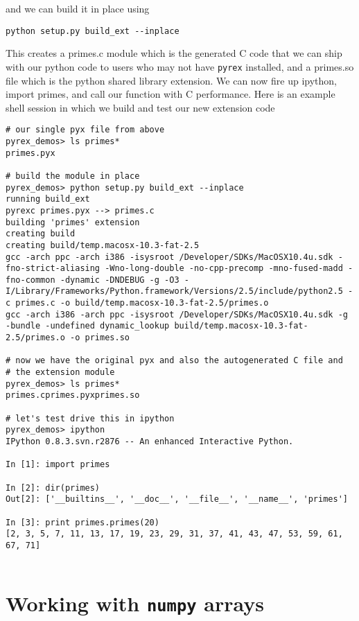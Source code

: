 and we can build it in place using

\begin{lstlisting}
python setup.py build_ext --inplace
\end{lstlisting}

This creates a primes.c module which is the generated C code that we
can ship with our python code to users who may not have \texttt{pyrex}
installed, and a primes.so file which is the python shared library
extension.  We can now fire up ipython, import primes, and call our
function with C performance.  Here is an example shell session in
which we build and test our new extension code

\begin{lstlisting}
# our single pyx file from above
pyrex_demos> ls primes*
primes.pyx

# build the module in place
pyrex_demos> python setup.py build_ext --inplace
running build_ext
pyrexc primes.pyx --> primes.c
building 'primes' extension
creating build
creating build/temp.macosx-10.3-fat-2.5
gcc -arch ppc -arch i386 -isysroot /Developer/SDKs/MacOSX10.4u.sdk -fno-strict-aliasing -Wno-long-double -no-cpp-precomp -mno-fused-madd -fno-common -dynamic -DNDEBUG -g -O3 -I/Library/Frameworks/Python.framework/Versions/2.5/include/python2.5 -c primes.c -o build/temp.macosx-10.3-fat-2.5/primes.o
gcc -arch i386 -arch ppc -isysroot /Developer/SDKs/MacOSX10.4u.sdk -g -bundle -undefined dynamic_lookup build/temp.macosx-10.3-fat-2.5/primes.o -o primes.so

# now we have the original pyx and also the autogenerated C file and
# the extension module
pyrex_demos> ls primes*
primes.cprimes.pyxprimes.so

# let's test drive this in ipython
pyrex_demos> ipython
IPython 0.8.3.svn.r2876 -- An enhanced Interactive Python.

In [1]: import primes

In [2]: dir(primes)
Out[2]: ['__builtins__', '__doc__', '__file__', '__name__', 'primes']

In [3]: print primes.primes(20)
[2, 3, 5, 7, 11, 13, 17, 19, 23, 29, 31, 37, 41, 43, 47, 53, 59, 61, 67, 71]


\end{lstlisting}


\section{Working with \texttt{numpy} arrays}

